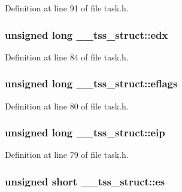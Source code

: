 Definition at line 91 of file task.\+h.

\subsubsection[{\texorpdfstring{edx}{edx}}]{\setlength{\rightskip}{0pt plus 5cm}unsigned long \+\_\+\+\_\+tss\+\_\+struct\+::edx}\hypertarget{struct____tss__struct_affcb93ba4eb271762b3167a13be06a83}{}\label{struct____tss__struct_affcb93ba4eb271762b3167a13be06a83}


Definition at line 84 of file task.\+h.

\subsubsection[{\texorpdfstring{eflags}{eflags}}]{\setlength{\rightskip}{0pt plus 5cm}unsigned long \+\_\+\+\_\+tss\+\_\+struct\+::eflags}\hypertarget{struct____tss__struct_ad0b672eea10bdec2d43cfee9f1ca5c4c}{}\label{struct____tss__struct_ad0b672eea10bdec2d43cfee9f1ca5c4c}


Definition at line 80 of file task.\+h.

\subsubsection[{\texorpdfstring{eip}{eip}}]{\setlength{\rightskip}{0pt plus 5cm}unsigned long \+\_\+\+\_\+tss\+\_\+struct\+::eip}\hypertarget{struct____tss__struct_a5405817bf20081bfbd4007f146e787bd}{}\label{struct____tss__struct_a5405817bf20081bfbd4007f146e787bd}


Definition at line 79 of file task.\+h.

\subsubsection[{\texorpdfstring{es}{es}}]{\setlength{\rightskip}{0pt plus 5cm}unsigned short \+\_\+\+\_\+tss\+\_\+struct\+::es}\hypertarget{struct____tss__struct_a068c08e101d0fd8e66cb315446f64532}{}\label{struct____tss__struct_a068c08e101d0fd8e66cb315446f64532}


